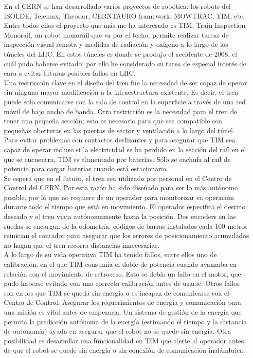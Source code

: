 \documentclass[a4paper, fontsize=11pt]{scrartcl} %
\numberwithin{equation}{section} %
\numberwithin{figure}{section} %
\numberwithin{table}{section} %
\begin{document}
	En el CERN se han desarrollado varios proyectos de robótica: los robots del ISOLDE, Telemax, Theodor, CERNTAURO framework, MOWTRAC, TIM, etc. Entre todos ellos el proyecto que más me ha interesado es TIM\cite{TIM1}\cite{TIM2}, Train Inspection Monorail, un robot monorail que va por el techo, permite realizar tareas de inspección visual remota y medidas de radiación y oxígeno a lo largo de los túneles del LHC. En estos túneles es donde se produjo el accidente de 2008, el cuál pudo haberse evitado\cite{ACCIDENTAVOID}; por ello he considerado su tarea de especial interés de cara a evitar futuras posibles fallas en LHC.\\
	
	Una restricción clave en el diseño del tren fue la necesidad de ser capaz de operar sin ninguna mayor modificación a la infraestructura existente. Es decir, el tren puede solo comunicarse con la sala de control en la superficie a través de una red móvil de bajo ancho de banda. Otra restricción es la necesidad para el tren de tener una pequeña sección; esto es necesario para que sea compatible con pequeñas oberturas en las puertas de sector y ventilación a lo largo del túnel. Para evitar problemas con contactos deslizantes y para asegurar que TIM sea capaz de operar incluso si la electricidad se ha perdido en la sección del raíl en el que se encuentra, TIM es alimentado por baterías. Sólo se enchufa al raíl de potencia para cargar baterías cuando está estacionario.\\
	
	Se espera que en el futuro, el tren sea utilizado por personal en el Centro de Control del CERN. Por esta razón ha sido diseñado para ser lo más autónomo posible, por lo que no requiere de un operador para monitorizar su operación durante todo el tiempo que está en movimiento. El operador especifica el destino deseado y el tren viaja autónomamente hasta la posición. Dos encoders en las ruedas se encargan de la odometría; códigos de barras instalados cada 100 metros reinician el contador para asegurar que los errores de posicionamiento acumulados no hagan que el tren recorra distancias innecesarias.\\
	
	A lo largo de su vida operativa TIM ha tenido fallos\cite{FAILLURES}, entre ellos uno de calibración, en el que TIM consumía el doble de potencia cuando avanzaba en relación con el movimiento de retroceso. Esto se debía un fallo en el motor, que pudo haberse evitado con una correcta calibración antes de usarse. Otros fallos son en los que TIM se queda sin energía o es incapaz de comunicarse con el Centro de Control. Asegurar los requerimientos de energía y comunicación para una misión es vital antes de empezarla. Un sistema de gestión de la energía que permita la predicción autónoma de la energía (estimando el tiempo y la distancia de autonomía) ayuda en asegurar que el robot no se quede sin energía. Otra posibilidad es desarrollar una funcionalidad en TIM que alerte al operador antes de que el robot se quede sin energía o sin conexión de comunicación inalámbrica.\\
	
\end{document}

